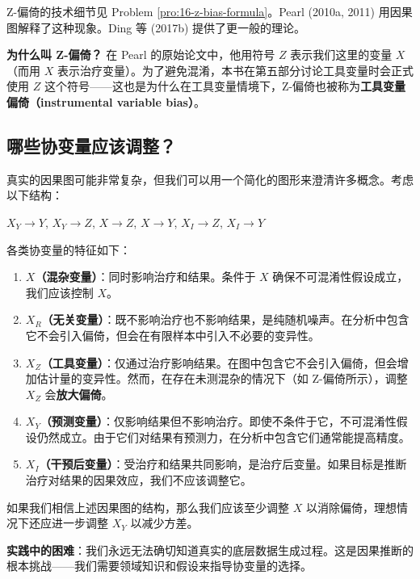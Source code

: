 Z-偏倚的技术细节见 Problem \ref{pro:16-z-bias-formula}。Pearl (2010a, 2011) 用因果图解释了这种现象。Ding 等 (2017b) 提供了更一般的理论。

\textbf{为什么叫 Z-偏倚？} 在 Pearl 的原始论文中，他用符号 $Z$ 表示我们这里的变量 $X$（而用 $X$ 表示治疗变量）。为了避免混淆，本书在第五部分讨论工具变量时会正式使用 $Z$ 这个符号——这也是为什么在工具变量情境下，Z-偏倚也被称为\textbf{工具变量偏倚（instrumental variable bias）}。

\subsection{哪些协变量应该调整？}\label{sec:16-covariate-selection}

真实的因果图可能非常复杂，但我们可以用一个简化的图形来澄清许多概念。考虑以下结构：

\begin{center}
$X_Y \rightarrow Y$, $X_Y \rightarrow Z$, $X \rightarrow Z$, $X \rightarrow Y$, $X_I \rightarrow Z$, $X_I \rightarrow Y$
\end{center}

各类协变量的特征如下：

\begin{enumerate}
  \item \textbf{$X$（混杂变量）}：同时影响治疗和结果。条件于 $X$ 确保不可混淆性假设成立，我们应该控制 $X$。
  \item \textbf{$X_R$（无关变量）}：既不影响治疗也不影响结果，是纯随机噪声。在分析中包含它不会引入偏倚，但会在有限样本中引入不必要的变异性。
  \item \textbf{$X_Z$（工具变量）}：仅通过治疗影响结果。在图中包含它不会引入偏倚，但会增加估计量的变异性。然而，在存在未测混杂的情况下（如 Z-偏倚所示），调整 $X_Z$ 会\textbf{放大偏倚}。
  \item \textbf{$X_Y$（预测变量）}：仅影响结果但不影响治疗。即使不条件于它，不可混淆性假设仍然成立。由于它们对结果有预测力，在分析中包含它们通常能提高精度。
  \item \textbf{$X_I$（干预后变量）}：受治疗和结果共同影响，是治疗后变量。如果目标是推断治疗对结果的因果效应，我们不应该调整它。
\end{enumerate}

如果我们相信上述因果图的结构，那么我们应该至少调整 $X$ 以消除偏倚，理想情况下还应进一步调整 $X_Y$ 以减少方差。

\textbf{实践中的困难}：我们永远无法确切知道真实的底层数据生成过程。这是因果推断的根本挑战——我们需要领域知识和假设来指导协变量的选择。

